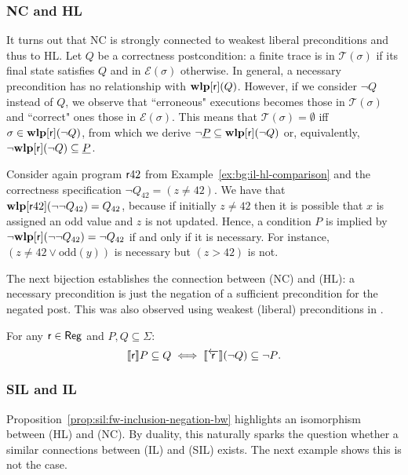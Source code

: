 \subsubsection{NC and HL}
It turns out that NC is strongly connected to weakest liberal preconditions and thus to HL.
Let $Q$ be a correctness postcondition: a finite trace is in $\mathcal{T}(\sigma)$ if its final state satisfies $Q$ and in $\mathcal{E}(\sigma)$ otherwise. In general, a necessary precondition has no relationship with $\textbf{wlp}[\mathsf{r}](Q)$. However, if we consider $\lnot Q$ instead of $Q$, we observe that ``erroneous" executions becomes those in $\mathcal{T}(\sigma)$ and ``correct" ones those in $\mathcal{E}(\sigma)$.
This means that $\mathcal{T}(\sigma) = \emptyset$ iff $\sigma \in \textbf{wlp}[\mathsf{r}](\lnot Q)$, from which we derive $\lnot \underline{P} \subseteq \textbf{wlp}[\mathsf{r}](\lnot Q)$ or, equivalently, $\lnot \textbf{wlp}[\mathsf{r}](\lnot Q) \subseteq \underline{P}$.

\begin{example}
	Consider again program $\mathsf{r} 42$ from Example~\ref{ex:bg:il-hl-comparison} and the correctness specification $\lnot Q_{42} = (z\neq 42)$. We have that $\textbf{wlp}[\mathsf{r} 42](\lnot \lnot Q_{42}) = Q_{42}$, because if initially $z \neq 42$ then it is possible that $x$ is assigned an odd value and $z$ is not updated.
	Hence, a condition $P$ is implied by $\lnot \textbf{wlp}[\mathsf{r}](\lnot\lnot Q_{42}) = \lnot Q_{42}$ if and only if it is necessary. For instance, $(z \neq 42 \lor \text{odd}(y))$ is necessary but $(z > 42)$ is not.
\end{example}

The next bijection establishes the connection between (NC) and (HL): a necessary precondition is just the negation of a sufficient precondition for the negated post. This was also observed using weakest (liberal) preconditions in \cite[Theorem~5.4]{ZK22}.

\begin{prop}\label{prop:sil:fw-inclusion-negation-bw}
	For any  $\mathsf{r}\in \mathsf{Reg}$ and $P, Q \subseteq \Sigma$:
	\[
	\llbracket\mathsf{r}\rrbracket P \subseteq Q \iff \llbracket\overleftarrow{\mathsf{r}}\rrbracket (\lnot Q) \subseteq \lnot P \text{.}
	\]
\end{prop}

\subsubsection{SIL and IL}
Proposition~\ref{prop:sil:fw-inclusion-negation-bw} highlights an isomorphism between (HL) and (NC). By duality, this naturally sparks the question whether a similar connections between (IL) and (SIL) exists. The next example shows this is not the case.

